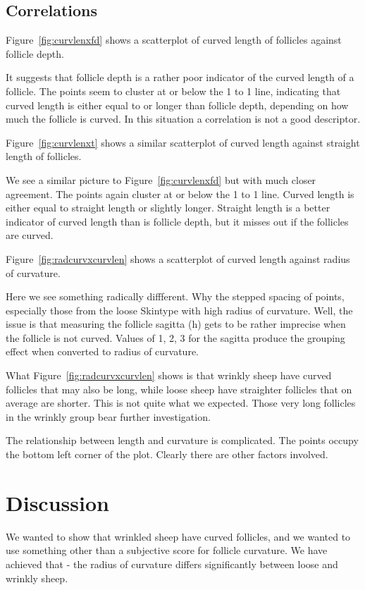 \documentclass[titlepage]{article}  %
\begin{document}
\subsection{Correlations}
Figure~\ref{fig:curvlenxfd} shows a scatterplot of curved length of follicles against follicle depth.

 It suggests that follicle depth is a rather poor indicator of the curved length of a follicle. The points seem to cluster at or below the 1 to 1 line, indicating that curved length is either equal to or longer than follicle depth, depending on how much the follicle is curved. In this situation a correlation is not a good descriptor. 

Figure~\ref{fig:curvlenxt} shows a similar scatterplot of curved length against straight length of follicles.

 We see a similar picture to Figure~\ref{fig:curvlenxfd} but with much closer agreement. The points again cluster at or below the 1 to 1 line. Curved length is either equal to straight length or slightly longer. Straight length is a better indicator of curved length than is follicle depth, but it misses out if the follicles are curved.

Figure~\ref{fig:radcurvxcurvlen} shows a scatterplot of curved length against radius of curvature.

Here we see something radically diffferent. Why the stepped spacing of points, especially those from the loose Skintype with high radius of curvature. Well, the issue is that measuring the follicle sagitta (h) gets to be rather imprecise when the follicle is not curved. Values of 1, 2, 3 for the sagitta produce the grouping effect when converted to radius of curvature.

What Figure~\ref{fig:radcurvxcurvlen} shows is that wrinkly sheep have curved follicles that may also be long, while loose sheep have straighter follicles that on average are shorter.
This is not quite what we expected. Those very long follicles in the wrinkly group bear further investigation.

The relationship between length and curvature is complicated. The points occupy the bottom left corner of the plot. Clearly there are other factors involved. 

\clearpage
\section{Discussion}
We wanted to show that wrinkled sheep have curved follicles, and we wanted to use something other than a subjective score for follicle curvature. We have achieved that - the radius of curvature differs significantly between loose and wrinkly sheep.
\end{document}
